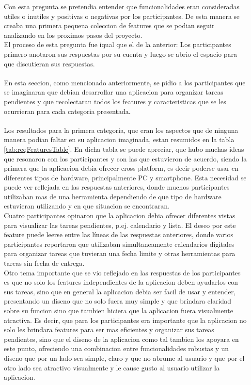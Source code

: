Con esta pregunta se pretendia entender que funcionalidades eran consideradas utiles o inutiles y positivas o negativas por los participantes. De esta manera se creaba una primera pequena coleccion de features que se podian seguir analizando en los proximos pasos del proyecto. \\ 
El proceso de esta pregunta fue iqual que el de la anterior: Los participantes primero anotaron sus respuestas por su cuenta y luego se abrio el espacio para que discutieran sus respuestas.\\
\\
En esta seccion, como mencionado anteriormente, se pidio a los participantes que se imaginaran que debian desarrollar una aplicacion para organizar tareas pendientes y que recolectaran todos los features y caracteristicas que se les ocurrieran para cada categoria presentada. \\
\\
Los resultados para la primera categoria, que eran los aspectos que de ninguna manera podian faltar en su aplicacion imaginada, estan resumidos en la tabla \ref{tab:reqFeaturesTable}. En dicha tabla se puede apreciar, que hubo muchas ideas que resonaron con los participantes y con las que estuvieron de acuerdo, siendo la primera que la aplicacion debia ofrecer cross-platform, es decir poderse usar en diferentes tipos de hardware, principalmente PC y smartphone. Esta necesidad se puede ver reflejada en las respuestas anteriores, donde muchos participantes utilizaban mas de una herramienta dependiendo de que tipo de hardware estuvieran utilizando y en que situacion se encontraran. \\
Cuatro participantes opinaron que la aplicacion debia ofrecer diferentes vistas para visualizar las tareas pendientes, p.ej. calendario y lista. El deseo por este feature puede leerse entre las líneas de las respuestas anteriores, donde varios participantes reportaron que utilizaban simultaneamente calendarios digitales para organizar tareas que tuvieran una fecha limite y otras herramientas para tareas sin fecha de entrega.\\
Otro tema importante que se vio reflejado en las respuestas de los participantes es que no solo los features independientes de la aplicacion deben ayudarlos con sus tareas, sino que en general la aplicacion debia ser facil de usar y entender, presentando un diseno que no solo fuera muy simple y que brindara claridad sobre su funcion sino que tambien hiciera que la aplicacion fuera visualmente atractiva. Es decir, que para los participantes era importante que la aplicacion no solo les brindara features para ser mas eficientes y organizar sus tareas pendientes, sino que el diseno de la aplicacion como tal tambien los apoyara en este punto, ofreciendo una combinacion entre funcionalidades robustas y un diseno que por un lado sea simple, claro y que no abrume al usuario y que por el otro lado sea atractivo visualmente y le cause gusto al usuario utilizar la aplicacion. 
